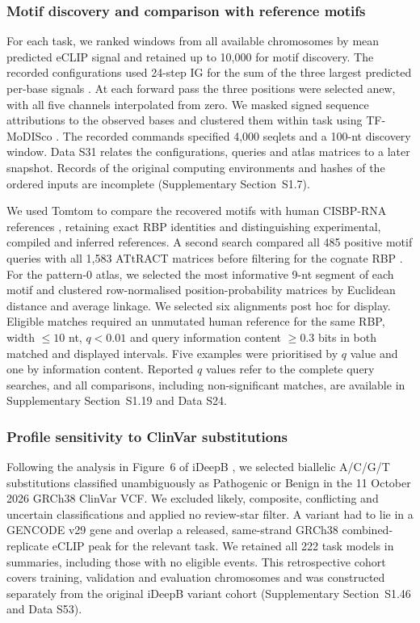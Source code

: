 \documentclass[webpdf,contemporary,large]{current_assets/oup-authoring-template}
\newcommand{\supsect}[1]{Supplementary Section~#1}
\begin{document}
\subsubsection{Motif discovery and comparison with reference motifs}\label{subsec:interp}

For each task, we ranked windows from all available chromosomes by mean predicted eCLIP signal and retained up to 10,000 for motif discovery. The recorded configurations used 24-step IG for the sum of the three largest predicted per-base signals \citep{sundararajan2017integrated}. At each forward pass the three positions were selected anew, with all five channels interpolated from zero. We masked signed sequence attributions to the observed bases and clustered them within task using TF-MoDISco \citep{shrikumar2018tfmodisco}. The recorded commands specified 4,000 seqlets and a 100-nt discovery window. Data S31 relates the configurations, queries and atlas matrices to a later snapshot. Records of the original computing environments and hashes of the ordered inputs are incomplete (\supsect{S1.7}).

We used Tomtom to compare the recovered motifs with human CISBP-RNA references \citep{ray2013compendium,gupta2007tomtom,bailey2015meme}, retaining exact RBP identities and distinguishing experimental, compiled and inferred references. A second search compared all 485 positive motif queries with all 1,583 ATtRACT matrices before filtering for the cognate RBP \citep{giudice2016attract}. For the pattern-0 atlas, we selected the most informative 9-nt segment of each motif and clustered row-normalised position-probability matrices by Euclidean distance and average linkage. We selected six alignments post hoc for display. Eligible matches required an unmutated human reference for the same RBP, width $\leq10$ nt, $q<0.01$ and query information content $\geq0.3$ bits in both matched and displayed intervals. Five examples were prioritised by $q$ value and one by information content. Reported $q$ values refer to the complete query searches, and all comparisons, including non-significant matches, are available in \supsect{S1.19} and Data S24.

\subsubsection{Profile sensitivity to ClinVar substitutions}\label{subsec:clinvar_profile_methods}

Following the analysis in Figure~6 of iDeepB \citep{liu2025ideepb,landrum2018clinvar}, we selected biallelic A/C/G/T substitutions classified unambiguously as Pathogenic or Benign in the 11 October 2026 GRCh38 ClinVar VCF. We excluded likely, composite, conflicting and uncertain classifications and applied no review-star filter. A variant had to lie in a GENCODE v29 gene and overlap a released, same-strand GRCh38 combined-replicate eCLIP peak for the relevant task. We retained all 222 task models in summaries, including those with no eligible events. This retrospective cohort covers training, validation and evaluation chromosomes and was constructed separately from the original iDeepB variant cohort (\supsect{S1.46} and Data S53).
\end{document}
